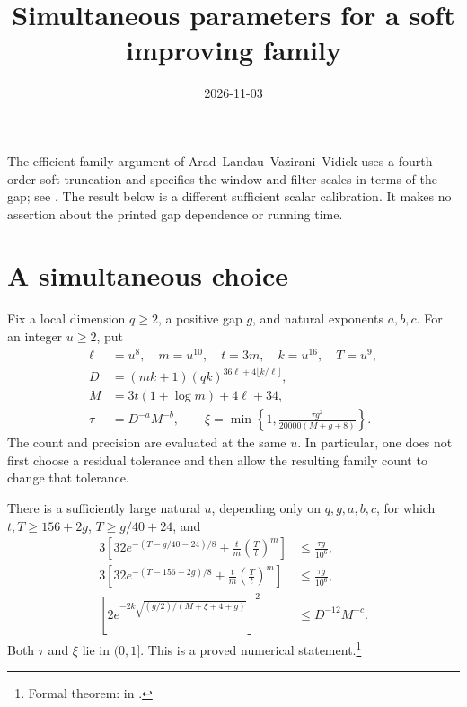 \documentclass{article}
\title{Simultaneous parameters for a soft improving family}
\author{}
\date{2026-11-03}
\begin{document}
\maketitle
{}

The efficient-family argument of Arad--Landau--Vazirani--Vidick uses a
fourth-order soft truncation and specifies the window and filter scales
in terms of the gap; see \cite[lines 1373--1420]{Arad2016RigorousRG}.
The result below is a different sufficient scalar calibration. It
makes no assertion about the printed gap dependence or running time.

\section{A simultaneous choice}

Fix a local dimension $q\ge2$, a positive gap $g$, and natural exponents
$a,b,c$. For an integer $u\ge2$, put
\begin{align}
    \ell&=u^8,\quad m=u^{10},\quad t=3m,\quad k=u^{16},\quad T=u^9,\\
    D&=(mk+1)(qk)^{36\ell+4\lfloor k/\ell\rfloor},\\
    M&=3t(1+\log m)+4\ell+34,\\
    \tau&=D^{-a}M^{-b},\qquad
    \xi=\min\left\{1,\frac{\tau g^2}{20000(M+g+8)}\right\}.
\end{align}
The count and precision are evaluated at the same $u$. In particular,
one does not first choose a residual tolerance and then allow the
resulting family count to change that tolerance.

There is a sufficiently large natural $u$, depending only on
$q,g,a,b,c$, for which $t,T\ge156+2g$, $T\ge g/40+24$, and
\begin{align}
    3\left[32e^{-(T-g/40-24)/8}
       +\frac tm\left(\frac Tt\right)^m\right]
       &\le\frac{\tau g}{10^6},\\
    3\left[32e^{-(T-156-2g)/8}
       +\frac tm\left(\frac Tt\right)^m\right]
       &\le\frac{\tau g}{10^6},\\
    \left[2e^{-2k\sqrt{(g/2)/(M+\xi+4+g)}}\right]^2
       &\le D^{-12}M^{-c}.
\end{align}
Both $\tau$ and $\xi$ lie in $(0,1]$. This is a proved numerical
statement.\footnote{Formal theorem:
 in
.}
\end{document}
